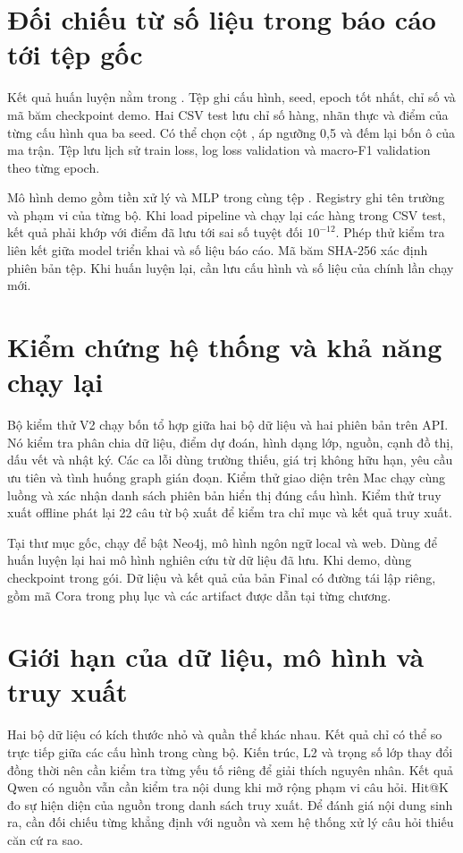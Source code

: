 \section{Đối chiếu từ số liệu trong báo cáo tới tệp gốc}
Kết quả huấn luyện nằm trong . Tệp ghi cấu hình, seed, epoch tốt nhất, chỉ số và mã băm checkpoint demo. Hai CSV test lưu chỉ số hàng, nhãn thực và điểm của từng cấu hình qua ba seed. Có thể chọn cột , áp ngưỡng 0,5 và đếm lại bốn ô của ma trận. Tệp  lưu lịch sử train loss, log loss validation và macro-F1 validation theo từng epoch.

Mô hình demo gồm tiền xử lý và MLP trong cùng tệp . Registry ghi tên trường và phạm vi của từng bộ. Khi load pipeline và chạy lại các hàng trong CSV test, kết quả phải khớp với điểm đã lưu tới sai số tuyệt đối \(10^{-12}\). Phép thử kiểm tra liên kết giữa model triển khai và số liệu báo cáo. Mã băm SHA-256 xác định phiên bản tệp. Khi huấn luyện lại, cần lưu cấu hình và số liệu của chính lần chạy mới.



\section{Kiểm chứng hệ thống và khả năng chạy lại}
Bộ kiểm thử V2 chạy bốn tổ hợp giữa hai bộ dữ liệu và hai phiên bản trên API. Nó kiểm tra phân chia dữ liệu, điểm dự đoán, hình dạng lớp, nguồn, cạnh đồ thị, dấu vết và nhật ký. Các ca lỗi dùng trường thiếu, giá trị không hữu hạn, yêu cầu ưu tiên và tình huống graph gián đoạn. Kiểm thử giao diện trên Mac chạy cùng luồng và xác nhận danh sách phiên bản hiển thị đúng cấu hình. Kiểm thử truy xuất offline phát lại 22 câu từ bộ xuất để kiểm tra chỉ mục và kết quả truy xuất.



Tại thư mục gốc, chạy  để bật Neo4j, mô hình ngôn ngữ local và web. Dùng  để huấn luyện lại hai mô hình nghiên cứu từ dữ liệu đã lưu. Khi demo, dùng checkpoint trong gói. Dữ liệu và kết quả của bản Final có đường tái lập riêng, gồm mã Cora trong phụ lục và các artifact được dẫn tại từng chương.

\section{Giới hạn của dữ liệu, mô hình và truy xuất}
Hai bộ dữ liệu có kích thước nhỏ và quần thể khác nhau. Kết quả chỉ có thể so trực tiếp giữa các cấu hình trong cùng bộ. Kiến trúc, L2 và trọng số lớp thay đổi đồng thời nên cần kiểm tra từng yếu tố riêng để giải thích nguyên nhân. Kết quả Qwen có nguồn vẫn cần kiểm tra nội dung khi mở rộng phạm vi câu hỏi. Hit@K đo sự hiện diện của nguồn trong danh sách truy xuất. Để đánh giá nội dung sinh ra, cần đối chiếu từng khẳng định với nguồn và xem hệ thống xử lý câu hỏi thiếu căn cứ ra sao.


